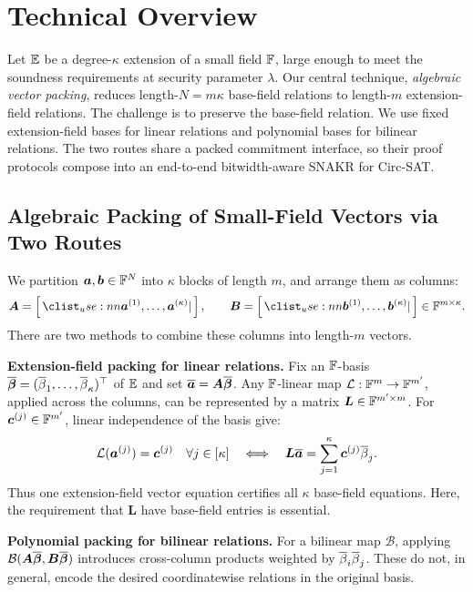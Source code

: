 \section{Technical Overview}
\label{sec:overview}

Let \(\mathbb{E}\) be a degree-\(\kappa\) extension of a
small field \({\mathbb{F}}\), large enough to meet the soundness
requirements at security parameter \(\lambda\).
Our central technique, \emph{algebraic vector packing}, reduces
length-\(N=m\kappa\) base-field relations to length-\(m\)
extension-field relations.
The challenge is to preserve the base-field relation.
We use fixed extension-field bases for linear relations and
polynomial bases for bilinear relations.
The two routes share a packed commitment interface,
so their proof protocols compose into an end-to-end bitwidth-aware SNAKR for Circ-SAT.

\subsection{Algebraic Packing of Small-Field Vectors via Two Routes}
\label{sec:dualPhase}

We partition \(\bm a,\bm b\in{\mathbb{F}}^N\) into \(\kappa\) blocks
of length \(m\), and arrange them as columns:
\[
    \bm A=\concat{\bm a^{(1)},\ldots,\bm a^{(\kappa)}},
    \qquad
    \bm B=\concat{\bm b^{(1)},\ldots,\bm b^{(\kappa)}}
       \in\Field^{m\times\kappa}.
\]
There are two methods to combine these columns into length-\(m\) vectors.

\medskip\noindent\textbf{Extension-field packing for linear relations.}
Fix an \({\mathbb{F}}\)-basis
\(\overline{\bm\beta}=(\overline{\beta}_1,\ldots,\overline{\beta}_\kappa)^\top\)
of \(\mathbb{E}\) and set
\(\overline{\bm a}=\bm A\overline{\bm\beta}\).
Any ${\mathbb{F}}$-linear map
\(\mathcal L:{\mathbb{F}}^m\to{\mathbb{F}}^{m'}\), applied across the columns, can be represented by a matrix
\(\bm L\in{\mathbb{F}}^{m'\times m}\).
For \(\bm c^{(j)}\in{\mathbb{F}}^{m'}\), linear independence
of the basis give:
\[
    \mathcal L(\bm a^{(j)})=\bm c^{(j)}
       \quad\forall j\in[\kappa]
    \quad\Longleftrightarrow\quad
    \bm L\overline{\bm a}
       =\sum_{j=1}^{\kappa}\bm c^{(j)}\overline{\beta}_j.
\]
Thus one extension-field vector equation certifies all \(\kappa\)
base-field equations.
Here, the requirement that \(\bm L\) have base-field entries is
essential.

\medskip\noindent\textbf{Polynomial packing for bilinear relations.}
For a bilinear map \(\mathcal B\), applying
\(\mathcal B(\bm A\overline{\bm\beta},\bm B\overline{\bm\beta})\)
introduces cross-column products weighted by
\(\overline{\beta}_i\overline{\beta}_j\).
These do not, in general, encode the desired coordinatewise
relations in the original basis.

